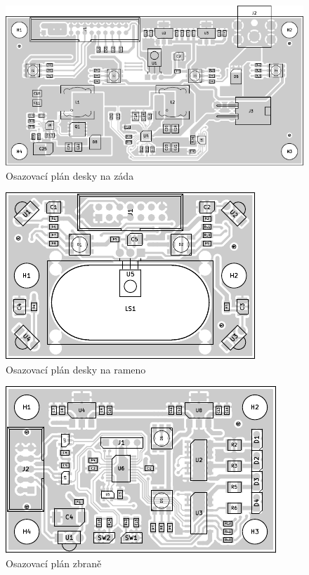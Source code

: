 \begin{figure}[h]
    \centering
    \includegraphics[page=1, width=\textwidth]{pcb/back-placement}
    \caption{Osazovací plán desky na záda}
\end{figure}
\begin{figure}[h]
    \centering
    \includegraphics[page=1, width=\textwidth]{pcb/shoulder-placement}
    \caption{Osazovací plán desky na rameno}
\end{figure}
\begin{figure}[h]
    \centering
    \includegraphics[page=1, width=\textwidth]{pcb/gun-placement}
    \caption{Osazovací plán zbraně}
\end{figure}



